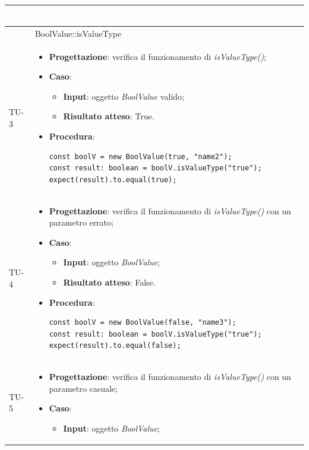 \begin{longtable}{|C{1.5cm}|C{14.5cm}|}
\begin{itemize}
\begin{lstlisting}
		\end{lstlisting}
	\end{itemize}\\
	\hline
	 & BoolValue::isValueType\\
	\hline
	{TU-3} & 
	\begin{itemize}
		\item \textbf{Progettazione}: verifica il funzionamento di \emph{isValueType()};
		\item \textbf{Caso}: 
		\begin{itemize}
			\item \textbf{Input}: oggetto \emph{BoolValue} valido;
			\item \textbf{Risultato atteso}: True.
		\end{itemize}
		\item \textbf{Procedura}:
		\begin{lstlisting}
const boolV = new BoolValue(true, "name2");
const result: boolean = boolV.isValueType("true");
expect(result).to.equal(true);
		\end{lstlisting}
	\end{itemize}\\
	\hline
	{TU-4} &  
	\begin{itemize}
		\item \textbf{Progettazione}: verifica il funzionamento di \emph{isValueType()} con un parametro errato;
		\item \textbf{Caso}: 
		\begin{itemize}
			\item \textbf{Input}: oggetto \emph{BoolValue};
			\item \textbf{Risultato atteso}: False.
		\end{itemize}
		\item \textbf{Procedura}:
		\begin{lstlisting}
const boolV = new BoolValue(false, "name3");
const result: boolean = boolV.isValueType("true");
expect(result).to.equal(false);		
		\end{lstlisting}
	\end{itemize}\\
	\hline
	{TU-5} &  
	\begin{itemize}
		\item \textbf{Progettazione}: verifica il funzionamento di \emph{isValueType()} con un parametro casuale;
		\item \textbf{Caso}: 
		\begin{itemize}
			\item \textbf{Input}: oggetto \emph{BoolValue};

\end{itemize}
\end{itemize}
\end{longtable}

